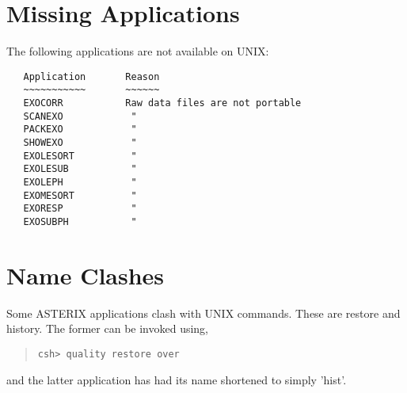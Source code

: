 \documentclass{book}
\renewcommand{\_}{{\tt\char'137}}     %
\begin{document}
\section{Missing Applications}
The following applications are not available on UNIX:
\begin{verbatim}
   Application       Reason
   ~~~~~~~~~~~       ~~~~~~
   EXOCORR           Raw data files are not portable
   SCANEXO            "
   PACKEXO            "
   SHOWEXO            "
   EXOLESORT          "
   EXOLESUB           "
   EXOLEPH            "
   EXOMESORT          "
   EXORESP            "
   EXOSUBPH           "
\end{verbatim}
\section{Name Clashes}
Some ASTERIX applications clash with UNIX commands. These are
restore and history. The former can be invoked using,
 
\begin{quote}\begin{verbatim}
csh> quality restore over
\end{verbatim}\end{quote}
and the latter application has had its name shortened to simply
'hist'.
 
\end{document}
